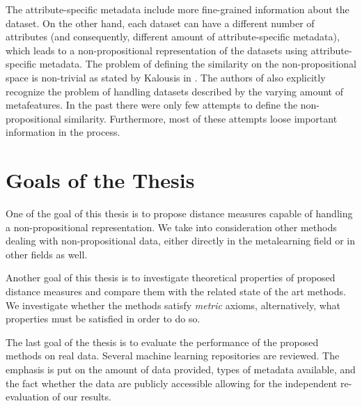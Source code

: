 \documentclass{article}
\begin{document}
\begin{refsegment}
The attribute-specific metadata include more fine-grained information about the dataset. On the other hand, each dataset can have a different number of attributes (and consequently, different amount of attribute-specific metadata), which leads to a non-propositional representation of the datasets using attribute-specific metadata. The problem of defining the similarity on the non-propositional space is non-trivial as stated by Kalousis in \cite{RepresentationalIssuesInMetalearning}. The authors of \cite{BrazdilMetalearning-2009} also explicitly recognize the problem of handling datasets described by the varying amount of metafeatures.
In the past there were only few attempts to define the non-propositional similarity. Furthermore, most of these attempts loose important information in the process.

\section{Goals of the Thesis}
One of the goal of this thesis is to propose distance measures capable of handling a non-propositional representation. We take into consideration other methods dealing with non-propositional data, either directly in the metalearning field or in other fields as well.

Another goal of this thesis is to investigate theoretical properties of proposed distance measures and compare them with the related state of the art methods. We investigate whether the methods satisfy \emph{metric} axioms, alternatively, what properties must be satisfied in order to do so.

The last goal of the thesis is to evaluate the performance of the proposed methods on real data. Several machine learning repositories are reviewed. The emphasis is put on the amount of data provided, types of metadata available, and the fact whether the data are publicly accessible allowing for the independent re-evaluation of our results.


\end{refsegment}
\end{document}

